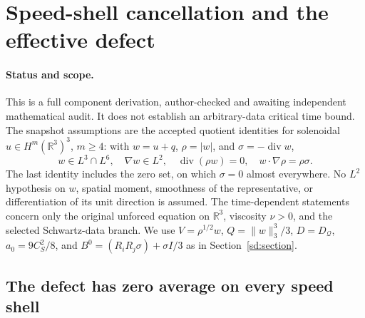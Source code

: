 \section{Speed-shell cancellation and the effective defect}
\label{ss:section}

\paragraph{Status and scope.}
This is a full component derivation, author-checked and awaiting independent
mathematical audit. It does not establish an arbitrary-data critical time
bound. The snapshot assumptions are the accepted quotient identities for
solenoidal $u\in H^m(\mathbb R^3)^3$, $m\ge4$: with
$w=u+q$, $\rho=|w|$, and $\sigma=-\operatorname{div}w$,
\[
 w\in L^3\cap L^6,\quad \nabla w\in L^2,\quad
 \operatorname{div}(\rho w)=0,\quad w\cdot\nabla\rho=\rho\sigma.
\]
The last identity includes the zero set, on which $\sigma=0$ almost
everywhere. No $L^2$ hypothesis on $w$, spatial moment, smoothness of the
representative, or differentiation of its unit direction is assumed.
The time-dependent statements concern only the original unforced equation
on $\mathbb R^3$, viscosity $\nu>0$, and the selected Schwartz-data branch.
We use $V=\rho^{1/2}w$, $Q=\|w\|_3^3/3$, $D=D_{\mathcal Q}$,
$a_0=9C_S^2/8$, and $B^0=(R_iR_j\sigma)+\sigma I/3$ as in
Section~\ref{sd:section}.

\subsection{The defect has zero average on every speed shell}


